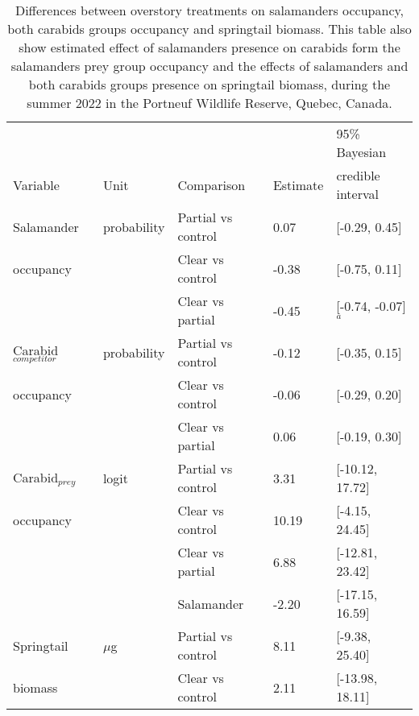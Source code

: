 \vspace{10pt}

\begin{table}[ht]
  \centering
  \caption[Differences between overstory treatments on the forest soil fauna.]
  {Differences between overstory treatments on salamanders occupancy, both carabids groups occupancy and springtail biomass. 
  This table also show estimated effect of salamanders presence on carabids form the salamanders prey group occupancy 
  and the effects of salamanders and both carabids groups presence on springtail biomass, during the summer 2022 in the Portneuf Wildlife Reserve, Quebec, Canada.}
  \label{tab:overstorysp}
  \begin{tabular}{lllll} 
      \hline
      &&&&95\% Bayesian \\
      Variable&Unit& Comparison & Estimate &  credible interval \\ [0.5ex] 
      \hline     
      Salamander           &probability& Partial vs control & \hspace{1mm}0.07 & [-0.29, 0.45] \\ 
      occupancy       && Clear vs control  & -0.38 & [-0.75, 0.11] \\ 
                          && Clear vs partial  & -0.45 & [-0.74, -0.07]$^{a}$ \\       
      Carabid$_{competitor}$ &probability& Partial vs control & -0.12 & [-0.35, 0.15] \\
      occupancy       && Clear vs control  & -0.06 & [-0.29, 0.20] \\ 
                          && Clear vs partial  & \hspace{1mm}0.06 & [-0.19, 0.30] \\ 
      Carabid$_{prey}$    &logit& Partial vs control & \hspace{1mm}3.31 & [-10.12, 17.72] \\
      occupancy             && Clear vs control  & \hspace{1mm}10.19 & [-4.15, 24.45] \\ 
                          && Clear vs partial  & \hspace{1mm}6.88 & [-12.81, 23.42] \\  
                          && Salamander        & -2.20 & [-17.15, 16.59] \\  
      Springtail          &$\mu$g& Partial vs control & \hspace{1mm}8.11 & [-9.38, 25.40] \\
      biomass             && Clear vs control  & \hspace{1mm}2.11 & [-13.98, 18.11] \\ 

\end{tabular}
\end{table}
